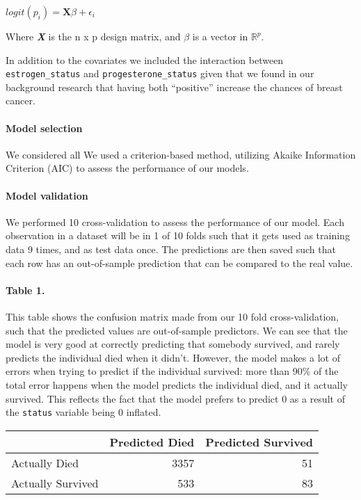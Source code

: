 \documentclass[]{article}
\let\oldparagraph\paragraph
\renewcommand{\paragraph}[1]{\oldparagraph{#1}\mbox{}}
\begin{document}
\(logit(p_i) = \mathbf{X}\beta+ \epsilon_i\)

Where \textbf{\emph{X}} is the n x p design matrix, and \(\beta\) is a
vector in \(\mathbb{R}^p\).

In addition to the covariates we included the interaction between
\texttt{estrogen\_status} and \texttt{progesterone\_status} given that
we found in our background research that having both ``positive''
increase the chances of breast cancer.

\hypertarget{model-selection}{%
\paragraph{Model selection}\label{model-selection}}

We considered all We used a criterion-based method, utilizing Akaike
Information Criterion (AIC) to assess the performance of our models.

\hypertarget{model-validation}{%
\paragraph{Model validation}\label{model-validation}}

We performed 10 cross-validation to assess the performance of our model.
Each observation in a dataset will be in 1 of 10 folds such that it gets
used as training data 9 times, and as test data once. The predictions
are then saved such that each row has an out-of-sample prediction that
can be compared to the real value.

\hypertarget{table-1.}{%
\paragraph{Table 1.}\label{table-1.}}

This table shows the confusion matrix made from our 10 fold
cross-validation, such that the predicted values are out-of-sample
predictors. We can see that the model is very good at correctly
predicting that somebody survived, and rarely predicts the individual
died when it didn't. However, the model makes a lot of errors when
trying to predict if the individual survived: more than 90\% of the
total error happens when the model predicts the individual died, and it
actually survived. This reflects the fact that the model prefers to
predict 0 as a result of the \texttt{status} variable being 0 inflated.

\begin{longtable}[]{@{}lrr@{}}
\toprule
& Predicted Died & Predicted Survived\tabularnewline
\midrule
\endhead
Actually Died & 3357 & 51\tabularnewline
Actually Survived & 533 & 83\tabularnewline
\bottomrule
\end{longtable}
\end{document}
